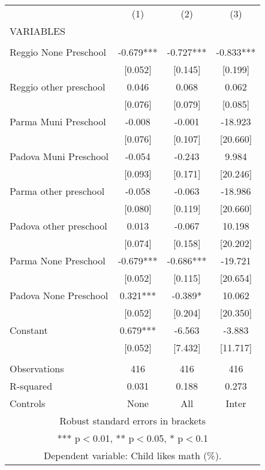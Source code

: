 \begin{tabular}{lccc} \hline
 & (1) & (2) & (3) \\
VARIABLES &  &  &  \\ \hline
 &  &  &  \\
Reggio None Preschool & -0.679*** & -0.727*** & -0.833*** \\
 & [0.052] & [0.145] & [0.199] \\
Reggio other preschool & 0.046 & 0.068 & 0.062 \\
 & [0.076] & [0.079] & [0.085] \\
Parma Muni Preschool & -0.008 & -0.001 & -18.923 \\
 & [0.076] & [0.107] & [20.660] \\
Padova Muni Preschool & -0.054 & -0.243 & 9.984 \\
 & [0.093] & [0.171] & [20.246] \\
Parma other preschool & -0.058 & -0.063 & -18.986 \\
 & [0.080] & [0.119] & [20.660] \\
Padova other preschool & 0.013 & -0.067 & 10.198 \\
 & [0.074] & [0.158] & [20.202] \\
Parma None Preschool & -0.679*** & -0.686*** & -19.721 \\
 & [0.052] & [0.115] & [20.654] \\
Padova None Preschool & 0.321*** & -0.389* & 10.062 \\
 & [0.052] & [0.204] & [20.350] \\
Constant & 0.679*** & -6.563 & -3.883 \\
 & [0.052] & [7.432] & [11.717] \\
 &  &  &  \\
Observations & 416 & 416 & 416 \\
R-squared & 0.031 & 0.188 & 0.273 \\
 Controls & None & All & Inter \\ \hline
\multicolumn{4}{c}{ Robust standard errors in brackets} \\
\multicolumn{4}{c}{ *** p$<$0.01, ** p$<$0.05, * p$<$0.1} \\
\multicolumn{4}{c}{ Dependent variable: Child likes math (\%).} \\
\end{tabular}
